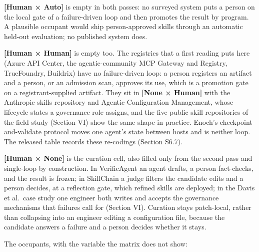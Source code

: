 \documentclass[
]{article}
\begin{document}
\textbf{{[}Human × Auto{]}} is empty in both passes: no surveyed system
puts a person on the local gate of a failure-driven loop and then
promotes the result by program. A plausible occupant would ship
person-approved skills through an automatic held-out evaluation; no
published system does.

\textbf{{[}Human × Human{]}} is empty too. The registries that a first
reading puts here (Azure API Center, the agentic-community MCP Gateway
and Registry, TrueFoundry, Buildrix) have no failure-driven loop: a
person registers an artifact and a person, or an admission scan,
approves its use, which is a promotion gate on a registrant-supplied
artifact. They sit in \textbf{{[}None × Human{]}} with the Anthropic
skills repository and Agentic Configuration Management, whose lifecycle
states a governance role assigns, and the five public skill repositories
of the field study (Section VI) show the same shape in practice. Enoch's
checkpoint-and-validate protocol moves one agent's state between hosts
and is neither loop. The released table records these re-codings
(Section S6.7).

\textbf{{[}Human × None{]}} is the curation cell, also filled only from
the second pass and single-loop by construction. In VerificAgent an
agent drafts, a person fact-checks, and the result is frozen; in
SkillChain a judge filters the candidate edits and a person decides, at
a reflection gate, which refined skills are deployed; in the Davis et
al.~case study one engineer both writes and accepts the governance
mechanisms that failures call for (Section VI). Curation stays
patch-local, rather than collapsing into an engineer editing a
configuration file, because the candidate answers a failure and a person
decides whether it stays.

The occupants, with the variable the matrix does not show:
\end{document}
